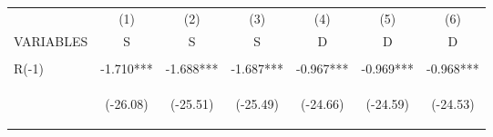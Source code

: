 \documentclass{standalone}
\begin{document}
\begin{tabular}{lcccccc} \hline
                     & (1)                                             & (2)                                             & (3)                                             & (4)                                            & (5)                                            & (6)                                            \\
    VARIABLES        & S                                               & S                                               & S                                               & D                                              & D                                              & D                                              \\ \hline
    \vspace{4pt}     & \begin{footnotesize}\end{footnotesize}          & \begin{footnotesize}\end{footnotesize}          & \begin{footnotesize}\end{footnotesize}          & \begin{footnotesize}\end{footnotesize}         & \begin{footnotesize}\end{footnotesize}         & \begin{footnotesize}\end{footnotesize}         \\
    R(-1)            & -1.710***                                       & -1.688***                                       & -1.687***                                       & -0.967***                                      & -0.969***                                      & -0.968***                                      \\
    \vspace{4pt}     & \begin{footnotesize}(-26.08)\end{footnotesize}  & \begin{footnotesize}(-25.51)\end{footnotesize}  & \begin{footnotesize}(-25.49)\end{footnotesize}  & \begin{footnotesize}(-24.66)\end{footnotesize} & \begin{footnotesize}(-24.59)\end{footnotesize} & \begin{footnotesize}(-24.53)\end{footnotesize} \\

\end{tabular}
\end{document}

